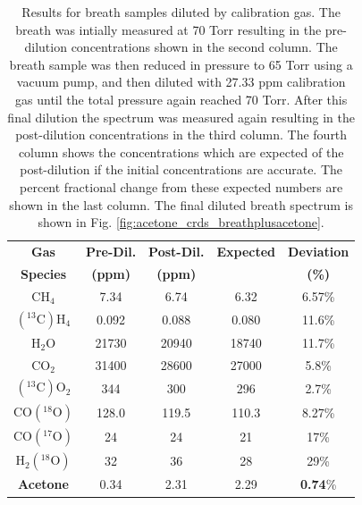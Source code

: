 \documentclass[8pt,a4paper]{report}
\begin{document}
	\begin{table}[H]
		\caption{Results for breath samples diluted by calibration gas. The breath was intially measured at 70 Torr resulting in the pre-dilution concentrations shown in the second column. The breath sample was then reduced in pressure to 65 Torr using a vacuum pump, and then diluted with 27.33 ppm calibration gas until the total pressure again reached 70 Torr. After this final dilution the spectrum was measured again resulting in the post-dilution concentrations in the third column. The fourth column shows the concentrations which are expected of the post-dilution if the initial concentrations are accurate. The percent fractional change from these expected numbers are shown in the last column. The final diluted breath spectrum is shown in Fig. \ref{fig:acetone_crds_breathplusacetone}.}
		\begin{center}
			\begin{tabular}{|c|c|c|c|c|}
				\hline
				\textbf{Gas} & \textbf{Pre-Dil.} & \textbf{Post-Dil.} & \textbf{Expected} & \textbf{Deviation} \\
				\textbf{Species} & \textbf{(ppm)} & \textbf{(ppm)} &  & \textbf{(\%)} \\
				\hline
				CH$_4$ 			       & 7.34 & 6.74 & 6.32 & 6.57\%\\ 
				\hline
				$\mathrm{(^{13}C)H_4}$ & 0.092 & 0.088 & 0.080 & 11.6\% \\ 
				\hline
				H$_2$O &                 21730 & 20940 & 18740 & 11.7\%\\
				\hline
				CO$_2$                 & 31400 & 28600 & 27000 & 5.8\%\\ 
				\hline
				$\mathrm{(^{13}C)O_2}$ & 344   & 300 & 296 & 2.7\%\\ 
				\hline
				$\mathrm{CO(^{18}O)}$  & 128.0 & 119.5 & 110.3 & 8.27\%\\ 
				\hline
				$\mathrm{CO(^{17}O)}$  & 24 & 24 & 21 & 17\%\\
				\hline
				$\mathrm{H_2(^{18}O)}$  & 32 & 36 & 28 & 29\%\\
				\hline
				\textbf{Acetone}       & 0.34 & 2.31 & 2.29 & \textbf{0.74}\%\\ 
				\hline
			\end{tabular}
		\end{center}
		\label{table:acetone_CRDS_concentrations}
	\end{table}
	
\end{document}
